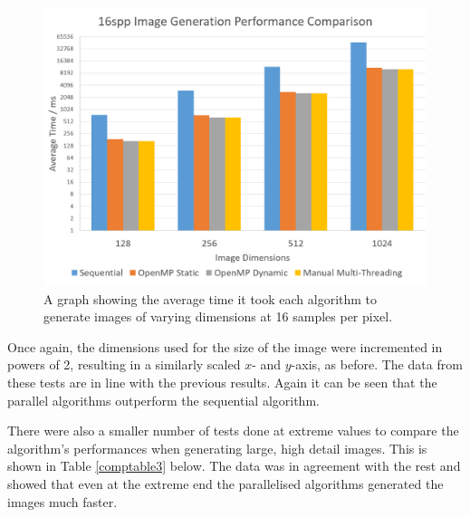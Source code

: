\documentclass[journal,transmag]{IEEEtran}
\begin{document}
	\begin{figure}[!h]
		\centering
		\includegraphics[width=\columnwidth]{IMAGES/performancecomparison2}
		\caption{A graph showing the average time it took each algorithm to generate images of varying dimensions at 16 samples per pixel.}
		\label{graph2}
	\end{figure}

	Once again, the dimensions used for the size of the image were incremented in powers of 2, resulting in a similarly scaled $x$- and $y$-axis, as before. The data from these tests are in line with the previous results. Again it can be seen that the parallel algorithms outperform the sequential algorithm.
	
	There were also a smaller number of tests done at extreme values to compare the algorithm's performances when generating large, high detail images. This is shown in Table \ref{comptable3} below. The data was in agreement with the rest and showed that even at the extreme end the parallelised algorithms generated the images much faster.
	
	\begin{table}[!h]
		\caption{Extreme Spp and Image Size Performance Comparison}
		\label{comptable3}
		\centering
	\end{table}
	
\end{document}
